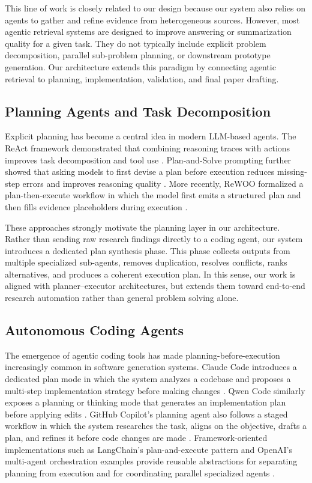 \documentclass[11pt,a4paper]{article}
\begin{document}
This line of work is closely related to our design because our system also relies on agents to gather and refine evidence from heterogeneous sources. However, most agentic retrieval systems are designed to improve answering or summarization quality for a given task. They do not typically include explicit problem decomposition, parallel sub-problem planning, or downstream prototype generation. Our architecture extends this paradigm by connecting agentic retrieval to planning, implementation, validation, and final paper drafting.

\subsection{Planning Agents and Task Decomposition}

Explicit planning has become a central idea in modern LLM-based agents. The ReAct framework demonstrated that combining reasoning traces with actions improves task decomposition and tool use \cite{react2023}. Plan-and-Solve prompting further showed that asking models to first devise a plan before execution reduces missing-step errors and improves reasoning quality \cite{planandsolve2023}. More recently, ReWOO formalized a plan-then-execute workflow in which the model first emits a structured plan and then fills evidence placeholders during execution \cite{rewoo2024}.

These approaches strongly motivate the planning layer in our architecture. Rather than sending raw research findings directly to a coding agent, our system introduces a dedicated plan synthesis phase. This phase collects outputs from multiple specialized sub-agents, removes duplication, resolves conflicts, ranks alternatives, and produces a coherent execution plan. In this sense, our work is aligned with planner--executor architectures, but extends them toward end-to-end research automation rather than general problem solving alone.

\subsection{Autonomous Coding Agents}

The emergence of agentic coding tools has made planning-before-execution increasingly common in software generation systems. Claude Code introduces a dedicated plan mode in which the system analyzes a codebase and proposes a multi-step implementation strategy before making changes \cite{claudecode2026}. Qwen Code similarly exposes a planning or thinking mode that generates an implementation plan before applying edits \cite{qwencode2025}. GitHub Copilot's planning agent also follows a staged workflow in which the system researches the task, aligns on the objective, drafts a plan, and refines it before code changes are made \cite{copilotplan2026}. Framework-oriented implementations such as LangChain's plan-and-execute pattern and OpenAI's multi-agent orchestration examples provide reusable abstractions for separating planning from execution and for coordinating parallel specialized agents \cite{langchainplanning2024,openaiparallelagents2025}.
\end{document}
